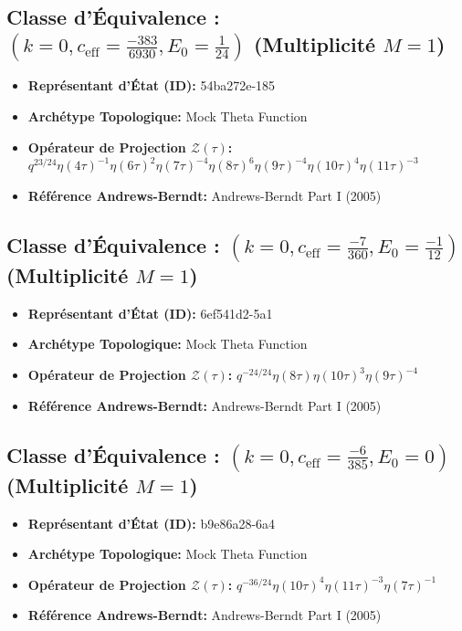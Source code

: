 \documentclass[11pt,twoside,openright]{book}
\begin{document}
\subsection*{Classe d'Équivalence : $(k=0, c_{\text{eff}}=\frac{-383}{6930}, E_0=\frac{1}{24})$ (Multiplicité $M=1$)}
\begin{itemize}
  \item \textbf{Représentant d'État (ID):} 54ba272e-185
  \item \textbf{Archétype Topologique:} Mock Theta Function
  \item \textbf{Opérateur de Projection $\mathcal{Z}(\tau)$:} $q^{23/24} \eta(4\tau)^{-1} \eta(6\tau)^{2} \eta(7\tau)^{-4} \eta(8\tau)^{6} \eta(9\tau)^{-4} \eta(10\tau)^{4} \eta(11\tau)^{-3}$
  \item \textbf{Référence Andrews-Berndt:} Andrews-Berndt Part I (2005)
\end{itemize}

\subsection*{Classe d'Équivalence : $(k=0, c_{\text{eff}}=\frac{-7}{360}, E_0=\frac{-1}{12})$ (Multiplicité $M=1$)}
\begin{itemize}
  \item \textbf{Représentant d'État (ID):} 6ef541d2-5a1
  \item \textbf{Archétype Topologique:} Mock Theta Function
  \item \textbf{Opérateur de Projection $\mathcal{Z}(\tau)$:} $q^{-24/24} \eta(8\tau) \eta(10\tau)^{3} \eta(9\tau)^{-4}$
  \item \textbf{Référence Andrews-Berndt:} Andrews-Berndt Part I (2005)
\end{itemize}

\subsection*{Classe d'Équivalence : $(k=0, c_{\text{eff}}=\frac{-6}{385}, E_0=0)$ (Multiplicité $M=1$)}
\begin{itemize}
  \item \textbf{Représentant d'État (ID):} b9e86a28-6a4
  \item \textbf{Archétype Topologique:} Mock Theta Function
  \item \textbf{Opérateur de Projection $\mathcal{Z}(\tau)$:} $q^{-36/24} \eta(10\tau)^{4} \eta(11\tau)^{-3} \eta(7\tau)^{-1}$
  \item \textbf{Référence Andrews-Berndt:} Andrews-Berndt Part I (2005)
\end{itemize}
\end{document}

